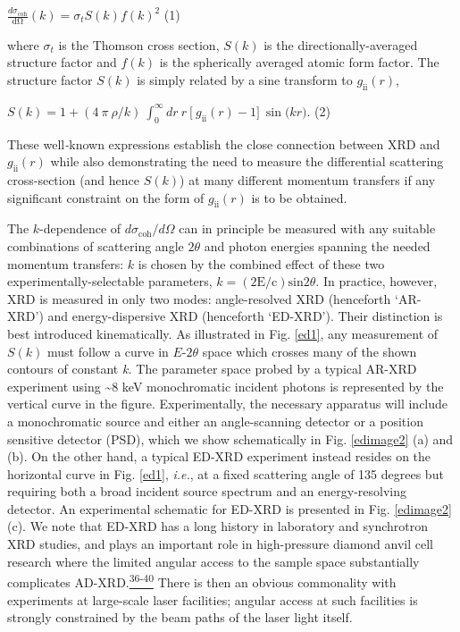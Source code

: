 \(\frac{d\sigma_{\text{coh}}}{\text{dΩ}}\left( k \right) = \sigma_{t}S\left( k \right){f\left( k \right)}^{2}\)
(1)

where \(\sigma_{t}\) is the Thomson cross section, \(S(k)\) is the
directionally-averaged structure factor and \(f\left( k \right)\) is the
spherically averaged atomic form factor. The structure factor \(S(k)\)
is simply related by a sine transform to
\(g_{\text{ii}}\left( r \right)\),

\(S\left( k \right) = 1 + (4\ \pi\ \rho/k)\ \int_{0}^{\infty}{dr\ r\ \lbrack\ g_{\text{ii}}\left( r \right) - 1\rbrack}\ \sin{(kr})\).
(2)

These well\emph{-}known expressions establish the close connection
between XRD and \(g_{\text{ii}}\left( r \right)\) while also
demonstrating the need to measure the differential scattering
cross-section (and hence \(S(k)\)) at many different momentum transfers
if any significant constraint on the form of
\(g_{\text{ii}}\left( r \right)\) is to be obtained.

The \(k\)-dependence of \(d\sigma_{\text{coh}}/d\Omega\) can in
principle be measured with any suitable combinations of scattering angle
\(2\theta\) and photon energies spanning the needed momentum transfers:
\(k\) is chosen by the combined effect of these two
experimentally-selectable parameters,
\(k = \operatorname{(2E/c)sin}{2\theta}\). In practice, however, XRD is
measured in only two modes: angle-resolved XRD (henceforth `AR-XRD') and
energy-dispersive XRD (henceforth `ED-XRD'). Their distinction is best
introduced kinematically. As illustrated in Fig. \ref{ed1}, any measurement of
\(S(k)\) must follow a curve in \(E\)-\(2\theta\) space which crosses
many of the shown contours of constant \emph{k.} The parameter space
probed by a typical AR-XRD experiment using \textasciitilde{}8 keV
monochromatic incident photons is represented by the vertical curve in
the figure. Experimentally, the necessary apparatus will include a
monochromatic source and either an angle-scanning detector or a position
sensitive detector (PSD), which we show schematically in Fig. \ref{edimage2} (a) and
(b). On the other hand, a typical ED-XRD experiment instead resides on
the horizontal curve in Fig. \ref{ed1}, \emph{i.e.}, at a fixed scattering angle
of 135 degrees but requiring both a broad incident source spectrum and
an energy-resolving detector. An experimental schematic for ED-XRD is
presented in Fig. \ref{edimage2}(c). We note that ED-XRD has a long history in
laboratory and synchrotron XRD studies, and plays an important role in
high-pressure diamond anvil cell research where the limited angular
access to the sample space substantially complicates
AD-XRD.\hyperref[y.-feng-m.-somayazulu-r.-jaramillo-t.-rosenbaum-e.-isaacs-j.-hu-and-h.-k.-mao-review-of-scientific-instruments-76-063913-2005.]{\textsuperscript{36-40}}
There is then an obvious commonality with experiments at large-scale
laser facilities; angular access at such facilities is strongly
constrained by the beam paths of the laser light itself.

